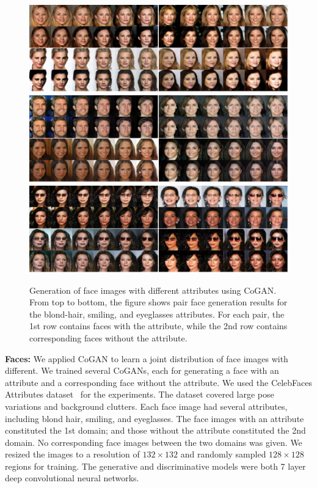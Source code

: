\begin{figure}[thb!]
\centering
\includegraphics[trim=0in 0.0in 0in 0in, width=1.\textwidth]{result_face_blondhair_small.pdf}
\includegraphics[trim=0in 0.0in 0in 0in, width=1.\textwidth]{result_face_smiling_small.pdf}
\includegraphics[trim=0in 0.2in 0in 0in, width=1.\textwidth]{result_face_eyeglasses_small.pdf}
\caption{\small Generation of face images with different attributes using CoGAN. From top to bottom, the figure shows pair face generation results for the blond-hair, smiling, and eyeglasses attributes. For each pair, the 1st row contains faces with the attribute, while the 2nd row contains corresponding faces without the attribute.}
\label{fig::result_attr_faces}
\vspace{-2mm}
\end{figure}

{\bf Faces:} We applied CoGAN to learn a joint distribution of face images with different. We trained several CoGANs, each for generating a face with an attribute and a corresponding face without the attribute. We used the CelebFaces Attributes dataset~\cite{liu2015deep} for the experiments. The dataset covered large pose variations and background clutters. Each face image had several attributes, including blond hair, smiling, and eyeglasses. The face images with an attribute constituted the 1st domain; and those without the attribute constituted the 2nd domain. No corresponding face images between the two domains was given. We resized the images to a resolution of $132\times132$ and randomly sampled $128\times128$ regions for training. The generative and discriminative models were both 7 layer deep convolutional neural networks. 

